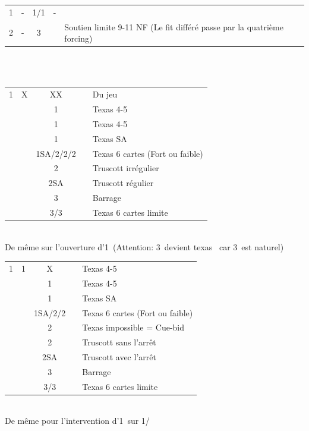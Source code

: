 \documentclass[a4paper, oneside, 11pt]{report}
\begin{document}
		\begin{tabular}{cccc|l}
		1\carreau & - & 1\coeur/1\pique & - &\\
		2\trefle  & - & 3\carreau && Soutien limite 9-11 NF (Le fit différé passe par la quatrième forcing)\\
		\end{tabular}\\\\

\newpage
		\begin{tabular}{cccc|l}
		1\trefle & X & XX && Du jeu\\
		&& 1\carreau && Texas 4-5\coeur\\
		&& 1\coeur && Texas 4-5\pique\\
		&& 1\pique && Texas SA\\
		&& 1SA/2\trefle/2\carreau/2\coeur && Texas 6 cartes (Fort ou faible)\\
		&& 2\pique && Truscott irrégulier\\
		&& 2SA && Truscott régulier\\
		&& 3\trefle && Barrage\\
		&& 3\carreau/3\coeur && Texas 6 cartes limite\\
		\end{tabular}\\
		De même sur l'ouverture d'1\carreau\ (Attention: 3\trefle\ devient texas \coeur\ car 3\carreau\ est naturel)\\

		\begin{tabular}{cccc|l}
		1\trefle & 1\carreau & X && Texas 4-5\coeur\\
		&& 1\coeur && Texas 4-5\pique\\
		&& 1\pique && Texas SA\\
		&& 1SA/2\carreau/2\coeur && Texas 6 cartes (Fort ou faible)\\
		&& 2\trefle && Texas impossible = Cue-bid\\
		&& 2\pique && Truscott sans l'arrêt \carreau\\
		&& 2SA && Truscott avec l'arrêt \carreau\\
		&& 3\trefle && Barrage\\
		&& 3\carreau/3\coeur && Texas 6 cartes limite\\
		\end{tabular}\\
		De même pour l'intervention d'1\coeur\ sur 1\trefle/\carreau\\
\end{document}
